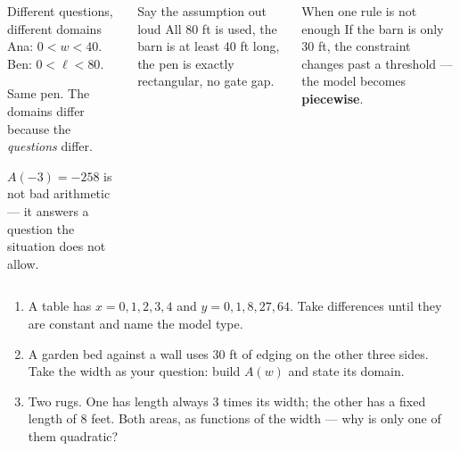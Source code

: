 \documentclass[aspectratio=169, 11pt]{beamer}
\begin{document}
\begin{frame}[t, plain]

  \begin{columns}[T, onlytextwidth]
      \begin{block}{Different questions, different domains}
        Ana: \(0 < w < 40\). \quad Ben: \(0 < \ell < 80\).

        \smallskip
        Same pen. The domains differ because the \textit{questions} differ.

        \smallskip
        \(A(-3) = -258\) is not bad arithmetic --- it answers a question the
        situation does not allow.
      \end{block}

      \begin{block}{Say the assumption out loud}
        All 80 ft is used, the barn is at least 40 ft long, the pen is exactly
        rectangular, no gate gap.
      \end{block}

      \medskip
      \begin{block}{When one rule is not enough}
        If the barn is only 30 ft, the constraint changes past a threshold ---
        the model becomes \textbf{piecewise}.
      \end{block}
  \end{columns}
\end{frame}

\begin{frame}[t, plain]

  \begin{enumerate}\setlength{\itemsep}{10pt}
    \item A table has \(x = 0,1,2,3,4\) and \(y = 0,1,8,27,64\). Take
          differences until they are constant and name the model type.

    \item A garden bed against a wall uses 30 ft of edging on the other three
          sides. Take the width as your question: build \(A(w)\) and state its
          domain.

    \item Two rugs. One has length always 3 times its width; the other has a
          fixed length of 8 feet. Both areas, as functions of the width ---
          why is only one of them quadratic?
  \end{enumerate}
\end{frame}
\end{document}
